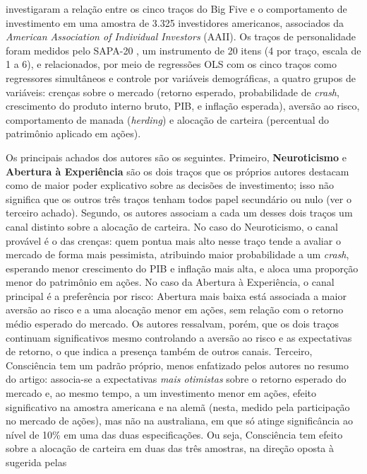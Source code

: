  investigaram a relação entre os cinco
traços do Big Five e o comportamento de investimento em uma amostra de
3.325 investidores americanos, associados da \textit{American Association
of Individual Investors} (AAII). Os traços de personalidade foram medidos
pelo SAPA-20 \cite{condonrevelle2015}, um instrumento de 20 itens (4 por
traço, escala de 1 a 6), e relacionados, por meio de regressões OLS com
os cinco traços como regressores simultâneos e controle por variáveis
demográficas, a quatro grupos de variáveis: crenças sobre o mercado
(retorno esperado, probabilidade de \textit{crash}, crescimento do
produto interno bruto, PIB, e inflação esperada), aversão ao risco,
comportamento de manada (\textit{herding}) e alocação de carteira
(percentual do patrimônio aplicado em ações).

Os principais achados dos autores são os seguintes. Primeiro,
\textbf{Neuroticismo} e \textbf{Abertura à Experiência} são os dois traços
que os próprios autores destacam como de maior poder explicativo sobre as
decisões de investimento; isso não significa que os outros três traços
tenham todos papel secundário ou nulo (ver o terceiro achado). Segundo,
os autores associam a cada um desses dois traços um canal distinto sobre
a alocação de carteira. No caso do Neuroticismo, o canal provável é o das
crenças: quem pontua mais alto nesse traço tende a avaliar o mercado de
forma mais pessimista, atribuindo maior probabilidade a um \textit{crash},
esperando menor crescimento do PIB e inflação mais alta, e aloca uma
proporção menor do patrimônio em ações. No caso da Abertura à
Experiência, o canal principal é a preferência por risco: Abertura mais
baixa está associada a maior aversão ao risco e a uma alocação menor em
ações, sem relação com o retorno médio esperado do mercado. Os autores
ressalvam, porém, que os dois traços continuam significativos mesmo
controlando a aversão ao risco e as expectativas de retorno, o que indica
a presença também de outros canais. Terceiro, Consciência tem
um padrão próprio, menos enfatizado pelos autores no resumo do artigo:
associa-se a expectativas \textit{mais otimistas} sobre o retorno
esperado do mercado e, ao mesmo tempo, a um investimento menor
em ações, efeito significativo na amostra americana e na alemã (nesta,
medido pela participação no mercado de ações), mas não na australiana,
em que só atinge significância ao nível de 10\% em uma das duas
especificações. Ou seja, Consciência tem efeito sobre a alocação de
carteira em duas das três amostras, na direção oposta à sugerida pelas
